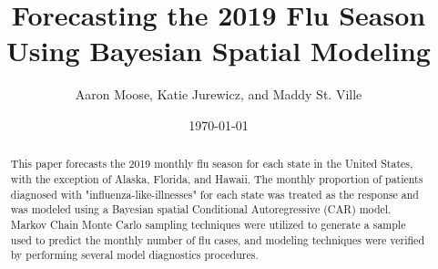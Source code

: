 \documentclass[12pt, onesided]{article}
\title{Forecasting the 2019 Flu Season Using Bayesian Spatial Modeling }
\author{Aaron Moose, Katie Jurewicz, and Maddy St. Ville}
\date{\today}
\begin{document}
 \maketitle
\begin{abstract}
This paper forecasts the 2019 monthly flu season for each state in the United States, with the exception of Alaska, Florida, and Hawaii. The monthly proportion of patients diagnosed with "influenza-like-illnesses" for each state was treated as the response and was modeled using a Bayesian spatial Conditional Autoregressive (CAR) model. Markov Chain Monte Carlo sampling techniques were utilized to generate a sample used to predict the monthly number of flu cases, and modeling techniques were verified by performing several model diagnostics procedures. 
\end{abstract}
\newpage
\end{document}
